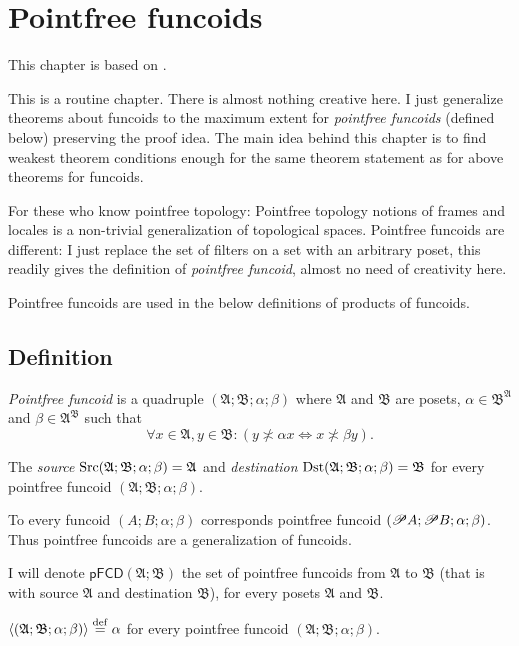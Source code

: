 
\chapter{\label{pf-funcoids}Pointfree funcoids}

This chapter is based on \cite{pointfree}.

This is a routine chapter. There is almost nothing creative here.
I just generalize theorems about funcoids to the maximum extent for
\emph{pointfree funcoids} (defined below) preserving the proof idea.
The main idea behind this chapter is to find weakest theorem conditions
enough for the same theorem statement as for above theorems for funcoids.

For these who know pointfree topology: Pointfree topology notions
of frames and locales is a non-trivial generalization of topological
spaces. Pointfree funcoids are different: I just replace the set of
filters on a set with an arbitrary poset, this readily gives the definition
of \emph{pointfree funcoid}, almost no need of creativity here.

Pointfree funcoids are used in the below definitions of products of
funcoids.


\section{Definition}
\begin{defn}
\emph{Pointfree funcoid} is a quadruple
$(\mathfrak{A};\mathfrak{B};\alpha;\beta)$ where $\mathfrak{A}$
and $\mathfrak{B}$ are posets, $\alpha\in\mathfrak{B}^{\mathfrak{A}}$
and $\beta\in\mathfrak{A}^{\mathfrak{B}}$ such that 
\[
\forall x\in\mathfrak{A},y\in\mathfrak{B}:(y\nasymp\alpha x\Leftrightarrow x\nasymp\beta y).
\]

\end{defn}

\begin{defn}
The
\emph{source} $\operatorname{Src}(\mathfrak{A};\mathfrak{B};\alpha;\beta)=\mathfrak{A}$
and \emph{destination} $\operatorname{Dst}(\mathfrak{A};\mathfrak{B};\alpha;\beta)=\mathfrak{B}$
for every pointfree funcoid $(\mathfrak{A};\mathfrak{B};\alpha;\beta)$.
\end{defn}
To every funcoid $(A;B;\alpha;\beta)$ corresponds pointfree funcoid
$(\mathscr{P} A;\mathscr{P} B;\alpha;\beta)$. Thus pointfree funcoids are
a generalization of funcoids.
\begin{defn}
I will denote $\mathsf{pFCD}(\mathfrak{A};\mathfrak{B})$ the set
of pointfree funcoids from $\mathfrak{A}$ to $\mathfrak{B}$ (that
is with source $\mathfrak{A}$ and destination $\mathfrak{B}$), for
every posets $\mathfrak{A}$ and $\mathfrak{B}$.

$\left\langle (\mathfrak{A};\mathfrak{B};\alpha;\beta)\right\rangle\overset{\mathrm{def}}{=}\alpha$ for
every pointfree funcoid $(\mathfrak{A};\mathfrak{B};\alpha;\beta)$.
\end{defn}

